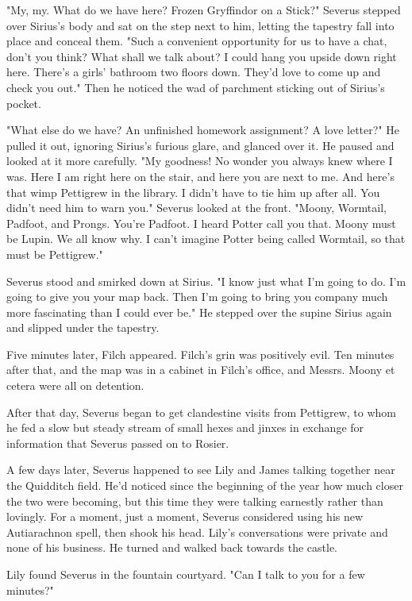 \documentclass[a4paper,11pt]{article}
\begin{document}
"My, my. What do we have here? Frozen Gryffindor on a Stick?" Severus stepped over Sirius's body and sat on the step next to him, letting the tapestry fall into place and conceal them. "Such a convenient opportunity for us to have a chat, don't you think? What shall we talk about? I could hang you upside down right here. There's a girls' bathroom two floors down. They'd love to come up and check you out." Then he noticed the wad of parchment sticking out of Sirius's pocket.

"What else do we have? An unfinished homework assignment? A love letter?" He pulled it out, ignoring Sirius's furious glare, and glanced over it. He paused and looked at it more carefully. "My goodness! No wonder you always knew where I was. Here I am right here on the stair, and here you are next to me. And here's that wimp Pettigrew in the library. I didn't have to tie him up after all. You didn't need him to warn you." Severus looked at the front. "Moony, Wormtail, Padfoot, and Prongs. You're Padfoot. I heard Potter call you that. Moony must be Lupin. We all know why. I can't imagine Potter being called Wormtail, so that must be Pettigrew."

Severus stood and smirked down at Sirius. "I know just what I'm going to do. I'm going to give you your map back. Then I'm going to bring you company much more fascinating than I could ever be." He stepped over the supine Sirius again and slipped under the tapestry.

Five minutes later, Filch appeared. Filch's grin was positively evil. Ten minutes after that, and the map was in a cabinet in Filch's office, and Messrs. Moony et cetera were all on detention.

After that day, Severus began to get clandestine visits from Pettigrew, to whom he fed a slow but steady stream of small hexes and jinxes in exchange for information that Severus passed on to Rosier.

A few days later, Severus happened to see Lily and James talking together near the Quidditch field. He'd noticed since the beginning of the year how much closer the two were becoming, but this time they were talking earnestly rather than lovingly. For a moment, just a moment, Severus considered using his new Autiarachnon spell, then shook his head. Lily's conversations were private and none of his business. He turned and walked back towards the castle.

Lily found Severus in the fountain courtyard. "Can I talk to you for a few minutes?"
\end{document}
